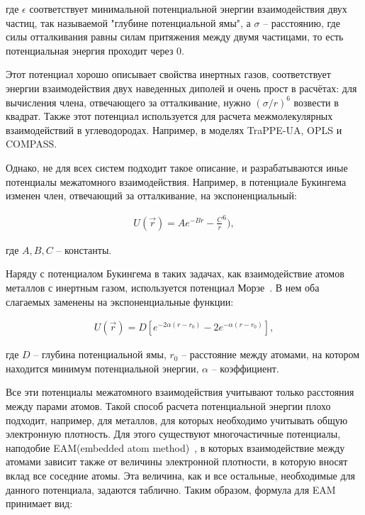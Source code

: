 где $\epsilon$ соответствует минимальной потенциальной энергии взаимодействия двух частиц, так называемой "глубине потенциальной ямы", а $\sigma$ \--- расстоянию, где силы отталкивания равны силам притяжения между двумя частицами, то есть потенциальная энергия проходит через 0.

Этот потенциал хорошо описывает свойства инертных газов, соответствует энергии взаимодействия двух наведенных диполей и очень прост в расчётах: для вычисления члена, отвечающего за отталкивание, нужно $(\sigma / r)^6$ возвести в квадрат. Также этот потенциал используется для расчета межмолекулярных взаимодействий в углеводородах. Например, в моделях TraPPE-UA, OPLS и COMPASS. 

Однако, не для всех систем подходит такое описание, и разрабатываются иные потенциалы межатомного взаимодействия. Например, в потенциале Букингема~\cite{buckingham_1938} изменен член, отвечающий за отталкивание, на экспоненциальный:

\begin{align}
	U(\overrightarrow{r}) = A e^{-B r} - \frac{C}{r}^6),
\end{align}

где $A, B, C$ \--- константы. 

Наряду с потенциалом Букингема в таких задачах, как взаимодействие атомов металлов с инертным газом, используется потенциал Морзе~\cite{morse_diatomic_1929}. В нем оба слагаемых заменены на экспоненциальные функции:

\begin{align}
	U(\overrightarrow{r}) = D [e^{-2 \alpha (r - r_0)} - 2 e^{-\alpha (r - r_0)}],
\end{align}

где $D$ \--- глубина потенциальной ямы, $r_0$ \--- расстояние между атомами, на котором находится минимум потенциальной энергии, $\alpha$ \--- коэффициент.

Все эти потенциалы межатомного взаимодействия учитывают только расстояния между парами атомов. Такой способ расчета потенциальной энергии плохо подходит, например, для металлов, для которых необходимо учитывать общую электронную плотность. Для этого существуют многочастичные потенциалы, наподобие EAM(embedded atom method)~\cite{daw_embedded-atom_1984}, в которых взаимодействие между атомами зависит также от величины электронной плотности, в которую вносят вклад все соседние атомы. Эта величина, как и все остальные, необходимые для данного потенциала, задаются таблично. Таким образом, формула для EAM принимает вид:

